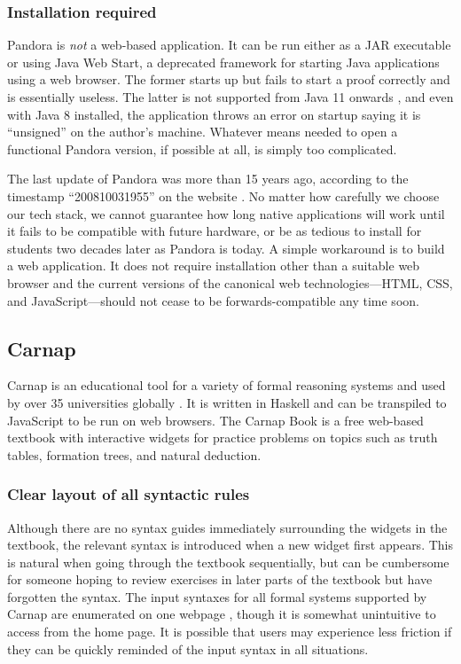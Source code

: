 \subsubsection{Installation required}
Pandora is \textit{not} a web-based application. It can be run either as a JAR executable or using Java Web Start, a deprecated framework for starting Java applications using a web browser. The former starts up but fails to start a proof correctly and is essentially useless. The latter is not supported from Java 11 onwards \cite{oracle:2020}, and even with Java 8 installed, the application throws an error on startup saying it is ``unsigned'' on the author's machine. Whatever means needed to open a functional Pandora version, if possible at all, is simply too complicated.

The last update of Pandora was more than 15 years ago, according to the timestamp ``200810031955'' on the website \cite{pandora}. No matter how carefully we choose our tech stack, we cannot guarantee how long native applications will work until it fails to be compatible with future hardware, or be as tedious to install for students two decades later as Pandora is today. A simple workaround is to build a web application. It does not require installation other than a suitable web browser and the current versions of the canonical web technologies---HTML, CSS, and JavaScript---should not cease to be forwards-compatible any time soon.

\subsection{Carnap}
Carnap \cite{carnap, carnap:2018} is an educational tool for a variety of formal reasoning systems and used by over 35 universities globally \cite{carnap:about}. It is written in Haskell and can be transpiled to JavaScript to be run on web browsers. The Carnap Book \cite{carnap:book} is a free web-based textbook with interactive widgets for practice problems on topics such as truth tables, formation trees, and natural deduction.

\subsubsection{Clear layout of all syntactic rules}
Although there are no syntax guides immediately surrounding the widgets in the textbook, the relevant syntax is introduced when a new widget first appears. This is natural when going through the textbook sequentially, but can be cumbersome for someone hoping to review exercises in later parts of the textbook but have forgotten the syntax. The input syntaxes for all formal systems supported by Carnap are enumerated on one webpage \cite{carnap:systems}, though it is somewhat unintuitive to access from the home page. It is possible that users may experience less friction if they can be quickly reminded of the input syntax in all situations.